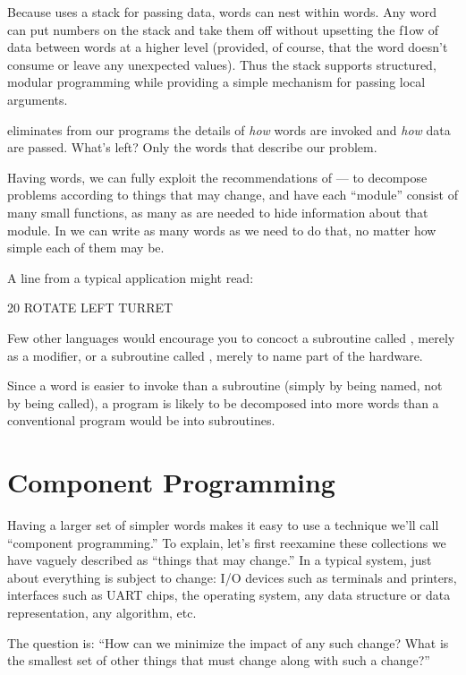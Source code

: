 Because \Forth{} uses a stack for passing data, words can nest within
words. Any word can put numbers on the stack and take them off without
upsetting the f1ow of data between words at a higher level (provided,
of course, that the word doesn't consume or leave any unexpected
values).  Thus the stack supports structured, modular programming
while providing a simple mechanism for passing local arguments.

\Forth{} eliminates from our programs the details of \emph{how} words are
invoked and \emph{how} data are passed. What's left? Only the words
that describe our problem.

Having words, we can fully exploit the recommendations of ---%
%
to decompose problems according to things that may change, and have
each ``module'' consist of many small functions, as many as are needed
to hide information about that module. In \Forth{} we can write as many
words as we need to do that, no matter how simple each of them may be.

A line from a typical \Forth{} application might read:
\begin{Code}
20 ROTATE LEFT TURRET
\end{Code}
Few other languages would encourage you to concoct a subroutine called
, merely as a modifier, or a subroutine called
, merely to name part of the hardware.

Since a \Forth{} word is easier to invoke than a subroutine (simply by
being named, not by being called), a \Forth{} program is likely to be
decomposed into more words than a conventional program would be into
subroutines.%
%


\section{Component Programming}%
%
Having a larger set of simpler words makes it easy to use a technique
we'll call ``component programming.'' To explain, let's first
reexamine these collections we have vaguely described as ``things that
may change.'' In a typical system, just about everything is subject to
change: I/O devices such as terminals and printers, interfaces such as
UART chips, the operating system, any data structure or data
representation, any algorithm, etc.

The question is: ``How can we minimize the impact of any such change?
What is the smallest set of other things that must change along with
such a change?''

